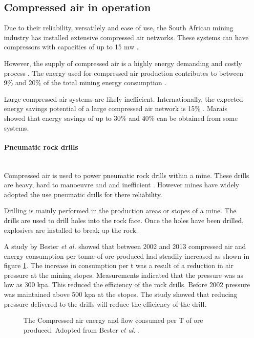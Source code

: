 \subsection{Compressed air in operation}
	Due to their reliability, versatilely and ease of use, the South African mining industry has installed extensive compressed air networks. These systems can have compressors with capacities of up to 15 \gls{mw} \cite{Marais2012PhD}.\par
	However, the supply of compressed air is a highly energy demanding and costly process \cite{padachi2009energy}.  The energy used for compressed air production contributes to between 9\% and 20\% of the total mining energy consumption 	\cite{Eskom2010Energy,du2011development}. \par
	Large compressed air systems are likely inefficient. Internationally, the expected energy savings potential of a large compressed air network is 15\% \cite{neale2009compressed}. Marais \cite{marais2013simplification} showed that energy savings of up to 30\% and 40\% can be obtained from some systems. 
	\paragraph*{Pneumatic rock drills}\leavevmode\\
	Compressed air is used to power pneumatic rock drills within a mine. These drills are heavy, hard to manoeuvre and  and inefficient \cite{van2008development}. However mines have widely adopted the use pneumatic drills for there reliability. \par
	Drilling is mainly performed in the production areas or stopes of a mine. The drills are used to drill holes into the rock face. Once the holes have been drilled, explosives are installed to break up the rock.\par
	A study by  Bester \textit{et al.} showed that between 2002 and 2013 compressed air and energy consumption per tonne of ore produced had steadily increased as shown in figure \ref{fig: Compressed energy and air flow per ton}. The increase in consumption per \gls{t} was a result of a reduction in air pressure at the mining stopes. Measurements indicated that the pressure was as low as 300 \gls{kpa}. This reduced the efficiency of the rock drills. Before 2002 pressure was maintained above 500 \gls{kpa} at the stopes.  The study showed that reducing pressure delivered to the drills will reduce the efficiency of the drill.\cite{bester2013effect} \par
	\begin{figure}[h]
	\centering
	\fbox{}
	\caption[The Compressed air energy and flow consumed per T of ore produced.]{The Compressed air energy and flow consumed per T of ore produced. Adopted from Bester \textit{et al.} \cite{bester2013effect}.}
	\label{fig: Compressed energy and air flow per ton}
	\end{figure}
